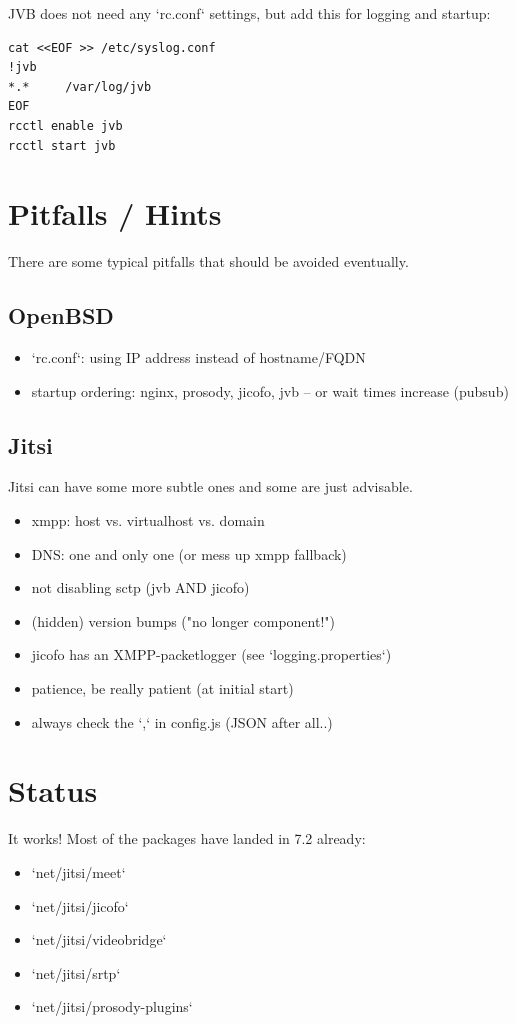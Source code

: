 \documentclass[10pt,conference]{IEEEtran}
\begin{document}
JVB does not need any `rc.conf` settings, but add this for logging and startup:
\begin{verbatim}
cat <<EOF >> /etc/syslog.conf
!jvb
*.*     /var/log/jvb
EOF
rcctl enable jvb
rcctl start jvb
\end{verbatim}

\section{Pitfalls / Hints}
There are some typical pitfalls that should be avoided eventually.

\subsection{OpenBSD}
\begin{itemize}
\item `rc.conf`: using IP address instead of hostname/FQDN
\item startup ordering: nginx, prosody, jicofo, jvb -- or wait times increase (pubsub)
\end{itemize}

\subsection{Jitsi}
Jitsi can have some more subtle ones and some are just advisable.
\begin{itemize}
\item xmpp: host vs. virtualhost vs. domain
\item DNS: one and only one (or mess up xmpp fallback)
\item not disabling sctp (jvb AND jicofo)
\item (hidden) version bumps ("no longer component!")
\item jicofo has an XMPP-packetlogger (see `logging.properties`)
\item patience, be really patient (at initial start)
\item always check the `,` in config.js (JSON after all..)
\end{itemize}

\section{Status}
It works! Most of the packages have landed in 7.2 already:
\begin{itemize}
\item `net/jitsi/meet`
\item `net/jitsi/jicofo`
\item `net/jitsi/videobridge`
\item `net/jitsi/srtp`
\item `net/jitsi/prosody-plugins`
\end{itemize}
\end{document}
